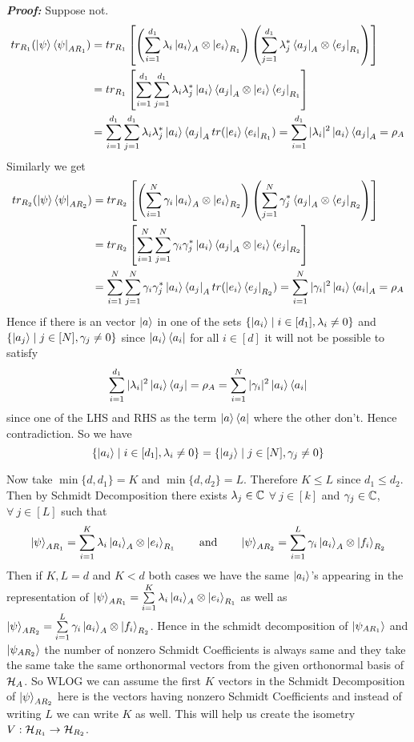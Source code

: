 \documentclass[a4paper, 11pt]{article}
\begin{document}
{\textbf{\textit{Proof:}} Suppose not. 
\begin{align*}
	tr_{R_1}(\ket{\psi}\bra{\psi}_{AR_1}) & = tr_{R_1}\left[\left( \sum_{i=1}^{d_1}\lambda_i\ket{a_i}_A\otimes \ket{e_i}_{R_1} \right)\left(\sum_{j=1}^{d_1}\lambda_j^*\bra{a_j}_A\otimes \bra{e_j}_{R_1} \right)\right]         \\
	                                      & = tr_{R_1}\left[\sum_{i=1}^{d_1}\sum_{j=1}^{d_1}\lambda_i\lambda_j^*\ket{a_i}\bra{a_j}_A\otimes \ket{e_i}\bra{e_j}_{R_1}  \right]                                  \\
	                                      & =\sum_{i=1}^{d_1}\sum_{j=1}^{d_1}\lambda_i\lambda_j^*\ket{a_i}\bra{a_j}_A tr(\ket{e_i}\bra{e_i}_{R_1}) = \sum_{i=1}^{d_1}|\lambda_i|^2\ket{a_i}\bra{a_j}_A  =\rho_A
\end{align*}Similarly we get \begin{align*}
tr_{R_2}(\ket{\psi}\bra{\psi}_{AR_2}) & = tr_{R_2}\left[\left( \sum_{i=1}^{N}\gamma_i\ket{a_i}_A\otimes \ket{e_i}_{R_2} \right)\left(\sum_{j=1}^{N}\gamma_j^*\bra{a_j}_A\otimes \bra{e_j}_{R_2} \right)\right]\\
& = tr_{R_2}\left[\sum_{i=1}^{N}\sum_{j=1}^{N}\gamma_i\gamma_j^*\ket{a_i}\bra{a_j}_A\otimes \ket{e_i}\bra{e_j}_{R_2}  \right]\\
& =\sum_{i=1}^{N}\sum_{j=1}^{N}\gamma_i\gamma_j^*\ket{a_i}\bra{a_j}_A tr(\ket{e_i}\bra{e_j}_{R_2})  = \sum_{i=1}^{N}|\gamma_i|^2\ket{a_i}\bra{a_i}_A  =\rho_A
\end{align*}Hence if there is an vector $\ket{a}$ in one of the sets $\{\ket{a_i}\mid i\in[d_1],\lambda_i\neq 0\}$ and $\{\ket{a_j}\mid j\in [N],\gamma_j\neq 0\}$ since $\ket{a_i}\bra{a_i}$ for all $i\in [d]$ it will not be possible to satisfy $$ \sum_{i=1}^{d_1}|\lambda_i|^2\ket{a_i}\bra{a_j} =\rho_A=\sum_{i=1}^{N}|\gamma_i|^2\ket{a_i}\bra{a_i} $$since one of the LHS and RHS as the term $\ket{a}\bra{a}$ where the other don't. Hence contradiction. So we have $$\{\ket{a_i}\mid i\in[d_1],\lambda_i\neq 0\}=\{\ket{a_j}\mid j\in [N],\gamma_j\neq 0\}$$ \Qed




\parinn

Now take $\min\{d,d_1\}=K$ and $\min\{d,d_2\}=L$. Therefore $K\leq L$ since $d_1\leq d_2$. Then by Schmidt Decomposition there exists $\lambda_j\in \mathbb{C}$ $\forall\ j\in[k]$ and $\gamma_j\in\mathbb{C}$, $\forall\ j\in [L]$ such that $$\ket{\psi}_{AR_1}=\sum_{i=1}^K\lambda_i\ket{a_i}_A\otimes \ket{e_i}_{R_1}\qquad\text{and}\qquad  \ket{\psi}_{AR_2}=\sum_{i=1}^L\gamma_i\ket{a_i}_A\otimes \ket{f_i}_{R_2}$$Then if $K,L=d$ and $K<d$ both cases we have the same $\ket{a_i}$'s appearing in the representation of $\ket{\psi}_{AR_1}=\sum\limits_{i=1}^K\lambda_i\ket{a_i}_A\otimes \ket{e_i}_{R_1}$ as well as $\ket{\psi}_{AR_2}=\sum\limits_{i=1}^L\gamma_i\ket{a_i}_A\otimes \ket{f_i}_{R_2}$. Hence in the schmidt decomposition of $\ket{\psi_{AR_1}}$ and $\ket{\psi_{AR_2}}$ the number of nonzero Schmidt Coefficients is always same and they take the same take the same orthonormal vectors from the given orthonormal basis of $\mathcal{H}_A$. So WLOG we can assume the first $K$ vectors in the Schmidt Decomposition of $\ket{\psi}_{AR_2}$ here is the vectors having nonzero Schmidt Coefficients and instead of writing $L$ we can write $K$ as well. This will help us create the isometry $V:\mathcal{H}_{R_1}\to \mathcal{H}_{R_2}$.

}
\end{document}
